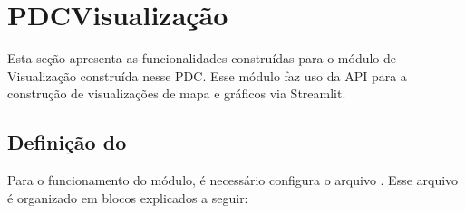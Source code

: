 \documentclass[letterpaper,10pt,brazil]{sphinxmanual}
\begin{document}
\begin{fulllineitems}
\begin{fulllineitems}
\end{fulllineitems}


\begin{fulllineitems}
\label{\detokenize{api_gen/apiModulo.api_visualizacao:apiModulo.api_visualizacao.ApiVis.visMultiMapa}}
\pysigstartsignatures
{}
\pysigstopsignatures
\end{fulllineitems}


\end{fulllineitems}


\sphinxstepscope


\chapter{PDC\sphinxhyphen{}Visualização}
\label{\detokenize{pdcvis:pdc-visualizacao}}\label{\detokenize{pdcvis::doc}}
\sphinxAtStartPar
Esta seção apresenta as funcionalidades construídas para o módulo de Visualização
construída nesse PDC. Esse módulo faz uso da API para a construção de visualizações de mapa e gráficos
via Streamlit.


\section{Definição do }
\label{\detokenize{pdcvis:definicao-do-config-yaml}}
\sphinxAtStartPar
Para o funcionamento do módulo, é necessário configura o arquivo .
Esse arquivo é organizado em blocos explicados a seguir:
\end{document}
